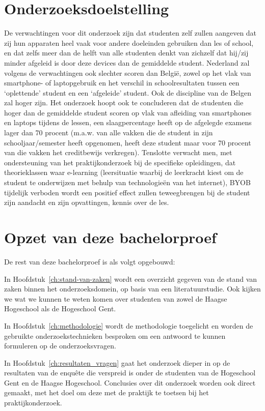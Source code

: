 \section{Onderzoeksdoelstelling}
\label{sec:onderzoeksdoelstelling}

De verwachtingen voor dit onderzoek zijn dat studenten zelf zullen aangeven dat zij hun apparaten heel vaak voor andere doeleinden gebruiken dan les of school, en dat zelfs meer dan de helft van alle studenten denkt van zichzelf dat hij/zij minder afgeleid is door deze devices dan de gemiddelde student. Nederland zal volgens de verwachtingen ook slechter scoren dan België, zowel op het vlak van smartphone- of laptopgebruik en het verschil in schoolresultaten tussen een ‘oplettende’ student en een ‘afgeleide’ student. Ook de discipline van de Belgen zal hoger zijn. Het onderzoek hoopt ook te concluderen dat de studenten die hoger dan de gemiddelde student scoren op vlak van afleiding van smartphones en laptops tijdens de lessen, een slaagpercentage heeft op de afgelegde examens lager dan 70 procent (m.a.w. van alle vakken die de student in zijn schooljaar/semester heeft opgenomen, heeft deze student maar voor 70 procent van die vakken het creditbewijs verkregen). Tenslotte verwacht men, met ondersteuning van het praktijkonderzoek bij de specifieke opleidingen, dat theorieklassen waar e-learning (leersituatie waarbij de leerkracht kiest om de student te onderwijzen met behulp van technologieën van het internet), BYOB tijdelijk verboden wordt een positief effect zullen teweegbrengen bij de student zijn aandacht en zijn opvattingen, kennis over de les.

\section{Opzet van deze bachelorproef}
\label{sec:opzet-bachelorproef}

De rest van deze bachelorproef is als volgt opgebouwd:

In Hoofdstuk~\ref{ch:stand-van-zaken} wordt een overzicht gegeven van de stand van zaken binnen het onderzoeksdomein, op basis van een literatuurstudie. Ook kijken we wat we kunnen te weten komen over studenten van zowel de Haagse Hogeschool als de Hogeschool Gent.

In Hoofdstuk~\ref{ch:methodologie} wordt de methodologie toegelicht en worden de gebruikte onderzoekstechnieken besproken om een antwoord te kunnen formuleren op de onderzoeksvragen.

In Hoofdstuk~\ref{ch:resultaten_vragen} gaat het onderzoek dieper in op de resultaten van de enquête die verspreid is onder de studenten van de Hogeschool Gent en de Haagse Hogeschool. Conclusies over dit onderzoek worden ook direct gemaakt, met het doel om deze met de praktijk te toetsen bij het praktijkonderzoek.

